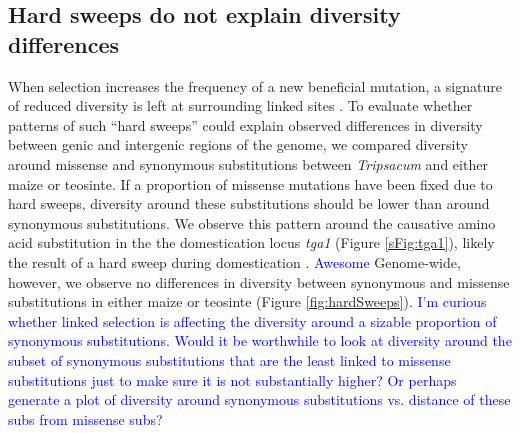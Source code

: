 \documentclass{pnastwo}
\newcommand{\mbh}[1]{\textcolor{blue}{\scriptsize #1}}
\begin{document}
\begin{article}
\subsection{Hard sweeps do not explain diversity differences} %
When selection increases the frequency of a new beneficial mutation, a signature of reduced diversity is left at surrounding linked sites \cite{smith1974}.
To evaluate whether patterns of such ``hard sweeps'' could explain observed differences in diversity between genic and intergenic regions of the genome, we compared diversity around missense and synonymous substitutions between \emph{Tripsacum} and either maize or teosinte.
If a proportion of missense mutations have been fixed due to hard sweeps, diversity around these substitutions should be lower than around synonymous substitutions. 
We observe this pattern around the causative amino acid substitution in the the domestication locus \emph{tga1} (Figure \ref{sFig:tga1}), likely the result of a hard sweep during domestication \cite{wang2005origin, wang2015}. \mbh{Awesome}
Genome-wide, however, we observe no differences in diversity between synonymous and missense substitutions in either maize or teosinte (Figure \ref{fig:hardSweeps}). \mbh{I'm curious whether linked selection is affecting the diversity around a sizable proportion of synonymous substitutions.  Would it be worthwhile to look at diversity around the subset of synonymous substitutions that are the least linked to missense substitutions just to make sure it is not substantially higher? Or perhaps generate a plot of diversity around synonymous substitutions vs. distance of these subs from missense subs?}


\end{article}
\end{document}
